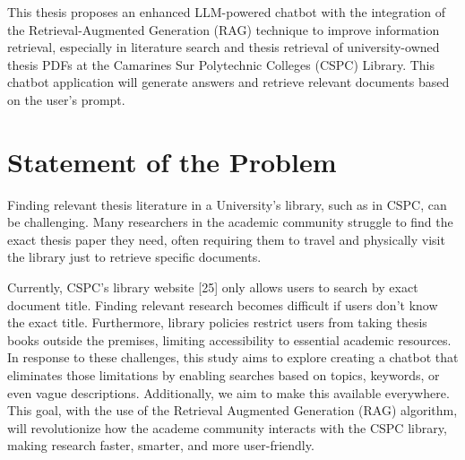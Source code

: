 \begin{refsection}
\bigbreak
\hspace{0.4cm}This thesis proposes an enhanced LLM-powered chatbot with the integration of the Retrieval-Augmented Generation (RAG) technique to improve information retrieval, especially in literature search and thesis retrieval of university-owned thesis PDFs at the Camarines Sur Polytechnic Colleges (CSPC) Library. This chatbot application will generate answers and retrieve relevant documents based on the user's prompt.


\section{Statement of the Problem}


\hspace{1cm}Finding relevant thesis literature in a University's library, such as in CSPC, can be challenging. Many researchers in the academic community struggle to find the exact thesis paper they need, often requiring them to travel and physically visit the library just to retrieve specific documents.

\bigbreak
\hspace{0.4cm}Currently, CSPC’s library website [25] only allows users to search by exact document title. Finding relevant research becomes difficult if users don’t know the exact title. Furthermore, library policies restrict users from taking thesis books outside the premises, limiting accessibility to essential academic resources.  In response to these challenges, this study aims to explore creating a chatbot that eliminates those limitations by enabling searches based on topics, keywords, or even vague descriptions. Additionally, we aim to make this available everywhere. This goal, with the use of the Retrieval Augmented Generation (RAG) algorithm, will revolutionize how the academe community interacts with the CSPC library, making research faster, smarter, and more user-friendly. 


\end{refsection}
